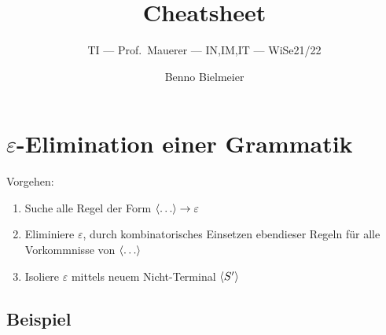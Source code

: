 \documentclass[a4paper,parskip=half,footsepline=on,headings=normal,titlepage=false]{scrartcl}
\title{Cheatsheet}
\subtitle{\acl{TI} --- Prof.~Mauerer --- IN,IM,IT --- \acs{WiSe}21/22}
\author{Benno Bielmeier}
\newcommand{\nt}[1]{\langle \uppercase{#1} \rangle}
\renewcommand{\epsilon}{\varepsilon}
\begin{document}

\begin{acronym}
\end{acronym}

\maketitle
\tableofcontents

\section{\texorpdfstring{$\epsilon$}{Epsilon}-Elimination einer Grammatik}
Vorgehen:
\begin{enumerate}[label=\alph*)]
	\item Suche alle Regel der Form {\color{c1}$\nt{\dots} \to \epsilon$}
	\item {\color{c2}Eliminiere $\epsilon$}, durch kombinatorisches Einsetzen ebendieser Regeln für alle Vorkommnisse von \textcolor{c1}{$\nt{\dots}$}
	\item {\color{c3}Isoliere $\epsilon$} mittels neuem Nicht-Terminal \textcolor{c3}{$\nt{S'}$}
\end{enumerate}

\subsection*{Beispiel}
\end{document}
